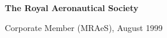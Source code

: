 \documentclass[10pt]{article}
\renewcommand{\section}[2]%
        {\pagebreak[2]\vspace{1.3\baselineskip}%
         \phantomsection\addcontentsline{toc}{section}{#1}%
         \hspace{0in}%
         \marginpar{
         \raggedright \scshape #1}#2}
\newenvironment{innerlist}[1][\enskip\textbullet]%
        {\begin{compactitem}[#1]}{\end{compactitem}}
\begin{document}
\textbf{The Royal Aeronautical Society}
\begin{innerlist}
\item Corporate Member (MRAeS), August 1999
\end{innerlist}
%
%
%
%
%
\end{document}
